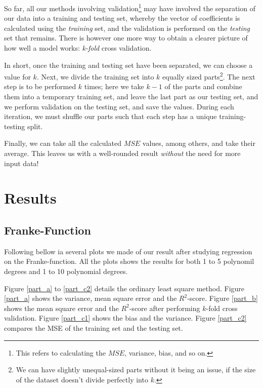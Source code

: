 \documentclass[a4paper,10pt,english]{article}
\begin{document}
So far, all our methods involving validation\footnote{This refers to calculating the $MSE$, variance, bias, and so on.} may have involved the separation of our data into a training and testing set, whereby the vector of coefficients is calculated using the \textit{training} set, and the validation is performed on the \textit{testing} set that remains.	There is however one more way to obtain a clearer picture of how well a model works: \textit{k-fold} cross validation.	

In short, once the training and testing set have been separated, we can choose a value for $k$.  Next, we divide the training set into $k$ equally sized parts\footnote{We can have slightly unequal-sized parts without it being an issue, if the size of the dataset doesn't divide perfectly into $k$.}.  The next step is to be performed $k$ times; here we take $k-1$ of the parts and combine them into a temporary training set, and leave the last part as our testing set, and we perform validation on the testing set, and save the values.  During each iteration, we must shuffle our parts such that each step has a unique training-testing split.

Finally, we can take all the calculated $MSE$ values, among others, and take their average.  This leaves us with a well-rounded result \textit{without} the need for more input data!



\section{Results}
\label{sec:results}

\subsection{Franke-Function}

Following bellow ia several plots we made of our result after studying regression on the Franke-function. All the plots shows the results for both 1 to 5 polynomil degrees and 1 to 10 polynomial degrees. %

Figure \ref{part_a} to \ref{part_c2} details the ordinary least square method.
Figure \ref{part_a} shows the variance, mean square error and the $R^2$-score.
Figure \ref{part_b} shows the mean square error and the $R^2$-score after performing $k$-fold cross validation. 
Figure \ref{part_c1} shows the bias and the variance. 
Figure \ref{part_c2} compares the MSE of the training set and the testing set.
\end{document}
